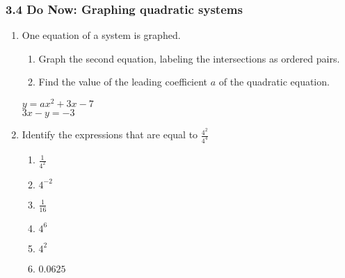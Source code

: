 \documentclass[12pt, twoside]{article}
\begin{document}
\subsubsection*{3.4 Do Now: Graphing quadratic systems}
\begin{enumerate}
  \item One equation of a system is graphed. 
\begin{enumerate}
    \item Graph the second equation, labeling the intersections as ordered pairs.
    \item Find the value of the leading coefficient $a$ of the quadratic equation.
\end{enumerate}
    \begin{multicols}{2}
      \hspace{1cm} $y = ax^2 + 3x - 7$ \\
      \columnbreak
      $3x - y = -3$
      \end{multicols}
       \vspace{3cm}
  
    \begin{center}
    \end{center}

\newpage
\item Identify the expressions that are equal to $\displaystyle \frac{4^2}{4^4}$
  \begin{multicols}{2}
  \begin{enumerate}
      \item $\displaystyle \frac{1}{4^2}$
      \item $4^{-2}$
      \item $\frac{1}{16}$
      \item $4^6$
      \item $4^{2}$
      \item $0.0625$
  \end{enumerate}
  \end{multicols}


\end{enumerate}
\end{document}

